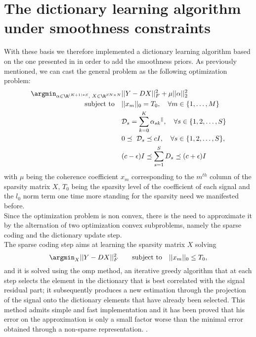 \section{The dictionary learning algorithm under smoothness constraints}
With these basis we therefore implemented a dictionary learning algorithm based on the one presented in \cite{Thanou2014} in order to add the smoothness priors. As previously mentioned, we can cast the general problem as the following optimization problem:
\begin{align}
  \argmin_{\small{\alpha \in \R^{(K+1)*S}, \text{ } X \in \R^{SN \times N}}} &||Y-DX||^2_F + \mu ||\alpha||_2^2 \label{eq:objDictionary}\\
  \text{subject to} \quad &||x_m||_0 = T_0, \quad \forall m \in \{1,\dots,M\} \notag \\
  &\mathcal{D}_s = \sum_{k=0}^{K}\alpha_{sk}\mathcal{^k}, \quad \forall s \in \{1,2,\dots,S\} \notag \\
  &0 \preceq \text{ } \mathcal{D}_s \preceq cI, \quad \forall s \in \{1,2,\dots , S\},\notag \\
  &(c-\epsilon)I \preceq \sum_{s=1}^{S}D_s \preceq (c+\epsilon)I \notag
\end{align}
with $\mu$ being the coherence coefficient  $x_m$ corresponding to the $m^{th}$ column of the sparsity matrix $X$, $T_0$ being the sparsity level of the coefficient of each signal and the $l_0$ norm term one time more standing for the sparsity need we manifested before.\\

Since the optimization problem is non convex, there is the need to approximate it by the alternation of two optimization convex subproblems, namely the sparse coding and the dictionary update step.\\

The sparse coding step aims at learning the sparsity matrix $X$ solving
\begin{equation}
  \argmin_{X} ||Y - DX||^2_F \qquad \text{subject to} \quad ||x_m||_0 \leq T_0,
\end{equation}
and it is solved using the \gls{omp} method, an iterative greedy algorithm that at each step selects the element in the dictionary that is best correlated with the signal residual part; it subsequently produces a new estimation through the projection of the signal onto the dictionary elements that have already been selected. This method admits simple and fast implementation and it has been proved that his error on the approximation is only a small factor worse than the minimal error obtained through a non-sparse representation. \cite{Tropp2004}.\\

